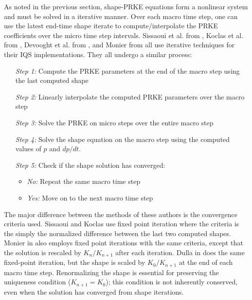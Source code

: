 \documentclass{elsarticle}
\begin{document}
As noted in the previous section, shape-PRKE equations form a nonlinear system and must be solved in a iterative manner.  Over each macro time step,  one can 
use the latest end-time shape iterate to compute/interpolate the PRKE coefficients over the micro time step intervals. 
Sissaoui et al. from \cite{Sissaoui_1995}, Koclas et al. from \cite{Koclas_1996}, Devooght et al. from \cite{Devooght_1984}, and Monier from \cite{Monier_diss} all use 
iterative techniques for their IQS implementations.  They all undergo a similar process:
\begin{adjustwidth*}{0cm}{4mm}
\begin{itemize}
\item[\textit{Step 1:}] Compute the PRKE parameters at the end of the macro step using the last computed shape
\item[\textit{Step 2:}] Linearly interpolate the computed PRKE parameters over the macro step
\item[\textit{Step 3:}] Solve the PRKE on micro steps over the entire macro step
\item[\textit{Step 4:}] Solve the shape equation on the macro step using the computed values of $p$ and $dp/dt$.
\item[\textit{Step 5:}] Check if the shape solution has converged:
	\begin{itemize}
	\item \textit{No:} Repeat the same macro time step
	\item \textit{Yes:} Move on to the next macro time step
	\end{itemize}
\end{itemize}
\end{adjustwidth*}

The major difference between the methods of these authors is the convergence criteria used.  Sissaoui and Koclas \cite{Sissaoui_1995, Koclas_1996} 
use fixed point iteration where the criteria is the simply the normalized difference between the last two computed shapes.  Monier in \cite{Monier_diss} 
also employs fixed point iterations with the same criteria, except that the solution is rescaled by $K_n/K_{n+1}$ after each iteration. Dulla in 
\cite{Dulla2008} does the same fixed-point iteration, but the shape is scaled by $K_0/K_{n+1}$ at the end of each macro time step. Renormalizing 
the shape is essential for preserving the uniqueness condition ($K_{n+1} = K_0$); this condition is not inherently conserved, even when the 
solution has converged from shape iterations.
\end{document}
